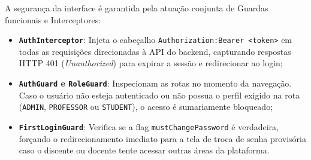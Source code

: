 A segurança da interface é garantida pela atuação conjunta de Guardas funcionais e Interceptores:
\begin{itemize}
    \item \textbf{\texttt{AuthInterceptor}}: Injeta o cabeçalho \texttt{Authorization:}\linebreak[0] \texttt{Bearer <token>} em todas as requisições direcionadas à API do backend, capturando respostas HTTP 401 (\textit{Unauthorized}) para expirar a sessão e redirecionar ao login;
    \item \textbf{\texttt{AuthGuard} e \texttt{RoleGuard}}: Inspecionam as rotas no momento da navegação. Caso o usuário não esteja autenticado ou não possua o perfil exigido na rota (\texttt{ADMIN}, \texttt{PROFESSOR} ou \texttt{STUDENT}), o acesso é sumariamente bloqueado;
    \item \textbf{\texttt{FirstLoginGuard}}: Verifica se a flag \texttt{mustChangePassword} é verdadeira, forçando o redirecionamento imediato para a tela de troca de senha provisória caso o discente ou docente tente acessar outras áreas da plataforma.
\end{itemize}

